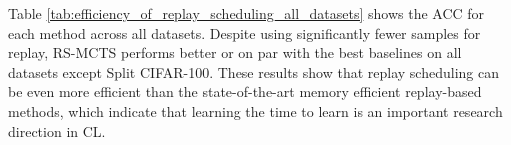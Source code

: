 Table \ref{tab:efficiency_of_replay_scheduling_all_datasets} shows the ACC for each method across all datasets. Despite using significantly fewer samples for replay, RS-MCTS performs better or on par with the best baselines on all datasets except Split CIFAR-100. These results show that replay scheduling can be even more efficient than the state-of-the-art memory efficient replay-based methods, which indicate that learning the time to learn is an important research direction in CL.



